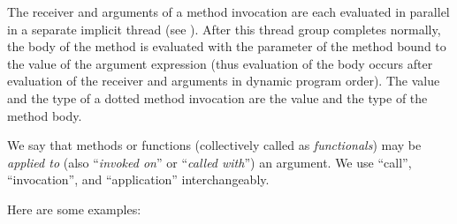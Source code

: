 The receiver and arguments of a method invocation are each evaluated
in parallel in a separate implicit thread (see
).  After this thread group completes
normally, the body of the method is evaluated with the parameter of
the method bound to the value of the argument expression (thus
evaluation of the body occurs after evaluation of the receiver and
arguments in dynamic program order).  The value and the type of a
dotted method invocation are the value and the type of the method
body.

We say that methods or functions (collectively called as
\emph{functionals}) may be \emph{applied to}
(also ``\emph{invoked on}'' or ``\emph{called with}'') an argument.
We use ``call'', ``invocation'', and ``application'' interchangeably.

Here are some examples:

